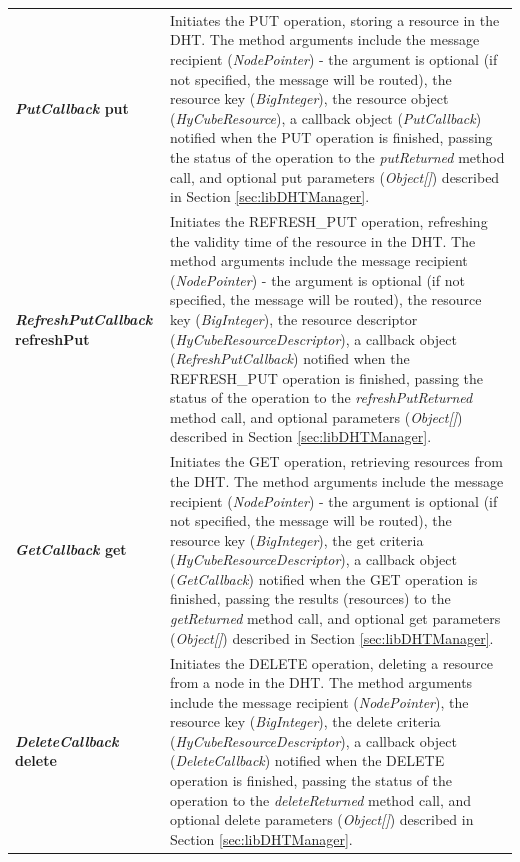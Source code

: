 \begin{center}
\begin{longtable}{p{6.5cm} p{8.5cm}}
	\textbf{\emph{PutCallback} put}												& Initiates the PUT operation, storing a resource in the DHT. The method arguments include the message recipient (\emph{NodePointer}) - the argument is optional (if not specified, the message will be routed), the resource key (\emph{BigInteger}), the resource object (\emph{HyCubeResource}), a callback object (\emph{PutCallback}) notified when the PUT operation is finished, passing the status of the operation to the \emph{putReturned} method call, and optional put parameters (\emph{Object[]}) described in Section \ref{sec:libDHTManager}.		\\[1.5mm]
	\textbf{\emph{RefreshPutCallback} refreshPut}								& Initiates the REFRESH\_PUT operation, refreshing the validity time of the resource in the DHT. The method arguments include the message recipient (\emph{NodePointer}) - the argument is optional (if not specified, the message will be routed), the resource key (\emph{BigInteger}), the resource descriptor (\emph{HyCubeResourceDescriptor}), a callback object (\emph{RefreshPutCallback}) notified when the REFRESH\_PUT operation is finished, passing the status of the operation to the \emph{refreshPutReturned} method call, and optional parameters (\emph{Object[]}) described in Section \ref{sec:libDHTManager}.			\\[1.5mm]
	\textbf{\emph{GetCallback} get}												& Initiates the GET operation, retrieving resources from the DHT. The method arguments include the message recipient (\emph{NodePointer}) - the argument is optional (if not specified, the message will be routed), the resource key (\emph{BigInteger}), the get criteria (\emph{HyCubeResourceDescriptor}), a callback object (\emph{GetCallback}) notified when the GET operation is finished, passing the results (resources) to the \emph{getReturned} method call, and optional get parameters (\emph{Object[]}) described in Section \ref{sec:libDHTManager}.			\\[1.5mm]
	\textbf{\emph{DeleteCallback} delete}										& Initiates the DELETE operation, deleting a resource from a node in the DHT. The method arguments include the message recipient (\emph{NodePointer}), the resource key (\emph{BigInteger}), the delete criteria (\emph{HyCubeResourceDescriptor}), a callback object (\emph{DeleteCallback}) notified when the DELETE operation is finished, passing the status of the operation to the \emph{deleteReturned} method call, and optional delete parameters (\emph{Object[]}) described in Section \ref{sec:libDHTManager}.			\\[1.5mm]

\end{longtable}
\end{center}
